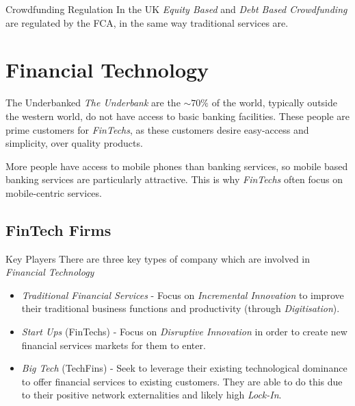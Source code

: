 \documentclass[11pt,a4paper]{article}
\begin{document}
  \begin{remark}{Crowdfunding Regulation}
    In the UK \textit{Equity Based} and \textit{Debt Based Crowdfunding} are regulated by the FCA, in the same way traditional services are.
  \end{remark}

\section{Financial Technology} \label{sec_FinancialTechnology}

  \begin{remark}{The Underbanked}
    \textit{The Underbank} are the $\sim70\%$ of the world, typically outside the western world, do not have access to basic banking facilities. These people are prime customers for \textit{FinTechs}, as these customers desire easy-access and simplicity, over quality products.
    \par More people have access to mobile phones than banking services, so mobile based banking services are particularly attractive. This is why \textit{FinTechs} often focus on mobile-centric services.
  \end{remark}

\subsection{FinTech Firms} \label{sec_FinTechFirms}

  \begin{proposition}{Key Players}
    There are three key types of company which are involved in \textit{Financial Technology}
    \begin{itemize}
      \item \textit{Traditional Financial Services} - Focus on \textit{Incremental Innovation} to improve their traditional business functions and productivity (through \textit{Digitisation}).
      \item \textit{Start Ups} (FinTechs) - Focus on \textit{Disruptive Innovation} in order to create new financial services markets for them to enter.
      \item \textit{Big Tech} (TechFins) - Seek to leverage their existing technological dominance to offer financial services to existing customers. They are able to do this due to their positive network externalities and likely high \textit{Lock-In}.
    \end{itemize}
  \end{proposition}
\end{document}
